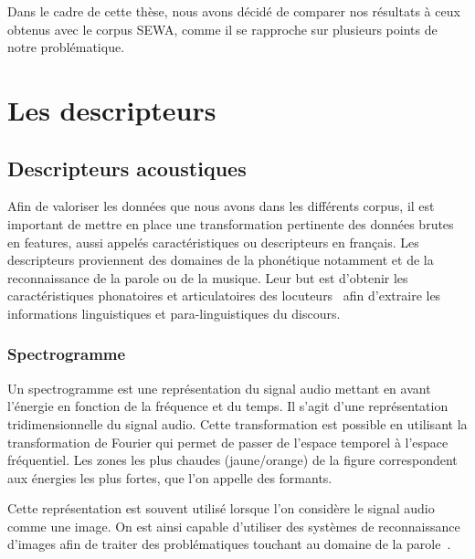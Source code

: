 Dans le cadre de cette thèse, nous avons décidé de comparer nos résultats à ceux obtenus avec le corpus SEWA, comme il se rapproche sur plusieurs points de notre problématique.

\section{Les descripteurs}
\subsection{Descripteurs acoustiques}
\label{sec:3.3.1}
Afin de valoriser les données que nous avons dans les différents corpus, il est important de mettre en place une transformation pertinente des données brutes en features, aussi appelés caractéristiques ou descripteurs en français. Les descripteurs proviennent des domaines de la phonétique notamment et de la reconnaissance de la parole ou de la musique. Leur but est d'obtenir les caractéristiques phonatoires et articulatoires des locuteurs~\cite{Scherer1986} afin d'extraire les informations linguistiques et para-linguistiques du discours.

\subsubsection{Spectrogramme}
%

Un spectrogramme est une représentation du signal audio mettant en avant l'énergie en fonction de la fréquence et du temps. %
Il s'agit d'une représentation tridimensionnelle du signal audio. Cette transformation est possible en utilisant la transformation de Fourier qui permet de passer de l'espace temporel à l'espace fréquentiel. Les zones les plus chaudes (jaune/orange) de la figure correspondent aux énergies les plus fortes, que l'on appelle des formants.

Cette représentation est souvent utilisé lorsque l'on considère le signal audio comme une image. On est ainsi capable d'utiliser des systèmes de reconnaissance d'images afin de traiter des problématiques touchant au domaine de la parole~\cite{Stolar2017}.


